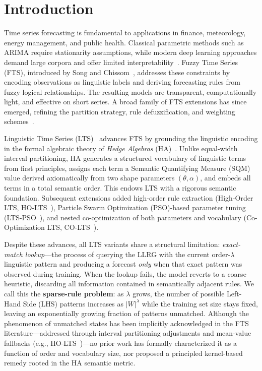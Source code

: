 \documentclass[conference]{IEEEtran}
\begin{document}
\section{Introduction}
\label{sec:intro}

Time series forecasting is fundamental to applications in finance,
meteorology, energy management, and public health. Classical parametric
methods such as ARIMA require stationarity assumptions, while modern
deep learning approaches demand large corpora and offer limited
interpretability~\cite{zhan2024dfcnn,wang2025bn}. Fuzzy Time Series
(FTS), introduced by Song and Chissom~\cite{song1993,song1994},
addresses these constraints by encoding observations as linguistic
labels and deriving forecasting rules from fuzzy logical relationships.
The resulting models are transparent, computationally light, and
effective on short series. A broad family of FTS extensions has since
emerged, refining the partition strategy, rule defuzzification, and
weighting schemes~\cite{chen1996,yu2005}.

Linguistic Time Series (LTS)~\cite{hieu2020lts} advances FTS by
grounding the linguistic encoding in the formal algebraic theory of
\textit{Hedge Algebras} (HA)~\cite{catho2002ha,catho2002sqm}. Unlike
equal-width interval partitioning, HA generates a structured vocabulary
of linguistic terms from first principles, assigns each term a
Semantic Quantifying Measure (SQM) value derived axiomatically from
two shape parameters $(\theta, \alpha)$, and embeds all terms in a
total semantic order. This endows LTS with a rigorous semantic
foundation. Subsequent extensions added high-order rule extraction
(High-Order LTS, HO-LTS~\cite{hieu2021holts}), Particle Swarm
Optimization (PSO)-based parameter tuning
(LTS-PSO~\cite{hieu2022ltspso}), and nested co-optimization of both
parameters and vocabulary
(Co-Optimization LTS, CO-LTS~\cite{hieu2023colts}).

Despite these advances, all LTS variants share a structural limitation:
\emph{exact-match lookup}—the process of querying the LLRG with the
current order-$\lambda$ linguistic pattern and producing a forecast
\emph{only} when that exact pattern was observed during training. When
the lookup fails, the model reverts to a coarse heuristic, discarding
all information contained in semantically adjacent rules. We call this
the \textbf{sparse-rule problem}: as $\lambda$ grows, the number of
possible Left-Hand Side (LHS) patterns increases as $|W|^\lambda$ while
the training set size stays fixed, leaving an exponentially growing
fraction of patterns unmatched. Although the phenomenon of unmatched
states has been implicitly acknowledged in the FTS literature—addressed
through interval partitioning adjustments and mean-value fallbacks
(e.g., HO-LTS~\cite{hieu2021holts})—no prior work has formally
characterized it as a function of order and vocabulary size, nor
proposed a principled kernel-based remedy rooted in the HA semantic
metric.
\end{document}
